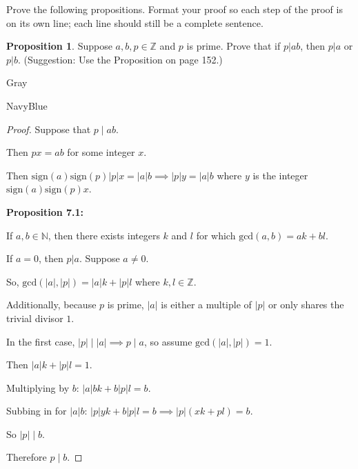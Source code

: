 \documentclass[12pt]{amsart}
\theoremstyle{named}
\newenvironment{prf}
{\medskip\begin{color}{Gray}\begin{framed}\begin{color}{NavyBlue}\begin{proof}[Proof]
\doublespacing}
{\end{proof}\end{color}\end{framed}\end{color}\medskip}
\theoremstyle{definition}
\newtheorem{proposition}{Proposition}
\newcommand{\Z}{\mathbb Z}
\begin{document}
Prove the following propositions. Format your proof so each step of the proof is on its own line; each line should still be a complete sentence.

\begin{proposition}
	Suppose $a,b,p\in\Z$ and $p$ is prime.
	Prove that if $p|ab$, then $p|a$ or $p|b$.
	(Suggestion: Use the Proposition on page 152.)
\end{proposition}

\begin{prf}
	\phantom{ }

	Suppose that $p\mid ab$. 
	
	Then $px = ab$ for some integer $x$.

	Then $\text{sign}(a) \text{sign}(p) |p|x = |a|b 
	\implies |p|y = |a|b$ where $y$ is the integer $\text{sign}(a)\text{sign}(p)x$.


	

	\textbf{Proposition 7.1:} 
	\begin{adjustwidth}{2em}{0em}
		If $a,b \in \mathbb N$, then
		there exists integers $k$ and $l$ for which $\text{gcd}(
		a,b) = ak + bl$.
	\end{adjustwidth} 

	If $a = 0$, then $p|a$. Suppose $a \neq 0$.

	So, $\text{gcd}(|a|,|p|) = |a|k + |p|l$ where $k,l \in \mathbb Z$.

	Additionally, because $p$ is prime, $|a|$ is either a
	multiple of $|p|$ or only shares the trivial divisor $1$.

	In the first case, $|p|\mid|a| \implies p \mid a$, so assume $\text{gcd}(|a|,|p|) = 1$.

	Then $|a|k + |p|l = 1$.

	Multiplying by $b$: $|a|bk + b|p|l = b$.

	Subbing in for $|a|b$: $|p|yk + b|p|l = b \implies |p|(xk +pl) = b$.

	So $|p| \mid b$.
	
	Therefore $p \mid b$. 
\end{prf}
\end{document}
